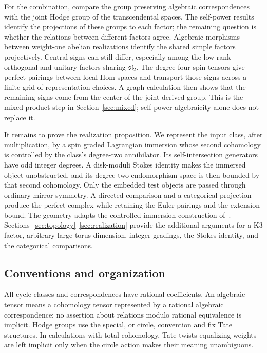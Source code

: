 For the combination, compare the group preserving algebraic
correspondences with the joint Hodge group of the transcendental
spaces.  The self-power results identify the projections of these
groups to each factor; the remaining question is whether the
relations between different factors agree.  Algebraic morphisms
between weight-one abelian realizations
identify the shared simple factors projectively.  Central signs can
still differ, especially among the low-rank orthogonal and unitary
factors sharing \(\mathfrak{sl}_2\).  The degree-four spin tensors
give perfect pairings between local Hom spaces and transport those
signs across a finite grid of representation choices.  A graph
calculation then shows that the remaining signs come from the center
of the joint derived group.  This is the mixed-product step in
Section~\ref{sec:mixed}; self-power algebraicity alone does not
replace it.

It remains to prove the realization proposition.  We represent the
input class, after multiplication, by a spin graded Lagrangian
immersion whose second cohomology is controlled by the class's
degree-two annihilator.  Its self-intersection generators have odd
integer degrees.  A disk-moduli Stokes identity makes the immersed
object unobstructed, and its degree-two endomorphism space is then
bounded by that second cohomology.  Only the embedded test objects
are passed through ordinary mirror symmetry.  A directed comparison
and a categorical projection produce the perfect complex while
retaining the Euler pairings and the extension bound.
The geometry adapts the controlled-immersion construction
of~\cite{A8}.  Sections~\ref{sec:topology}--\ref{sec:realization}
provide the additional arguments for a K3 factor, arbitrary large
torus dimension, integer gradings, the Stokes identity, and the
categorical comparisons.

\subsection{Conventions and organization}

All cycle classes and correspondences have rational coefficients.
An algebraic tensor means a cohomology tensor represented by a rational
algebraic correspondence; no assertion about relations modulo rational
equivalence is implicit.  Hodge groups use the special, or circle,
convention and fix Tate structures.  In calculations with total
cohomology, Tate twists equalizing weights are left implicit only
when the circle action makes their meaning unambiguous.

